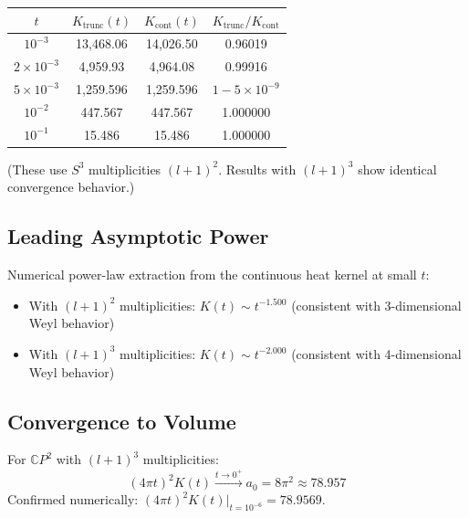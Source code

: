 \documentclass[12pt,a4paper]{article}
\begin{document}
\begin{center}
\begin{tabular}{cccc}
\toprule
$t$ & $K_{\mathrm{trunc}}(t)$ & $K_{\mathrm{cont}}(t)$ & $K_{\mathrm{trunc}}/K_{\mathrm{cont}}$ \\
\midrule
$10^{-3}$ & 13,468.06 & 14,026.50 & 0.96019 \\
$2 \times 10^{-3}$ & 4,959.93 & 4,964.08 & 0.99916 \\
$5 \times 10^{-3}$ & 1,259.596 & 1,259.596 & $1 - 5 \times 10^{-9}$ \\
$10^{-2}$ & 447.567 & 447.567 & 1.000000 \\
$10^{-1}$ & 15.486 & 15.486 & 1.000000 \\
\bottomrule
\end{tabular}
\end{center}

\noindent
(These use $S^3$ multiplicities $(l+1)^2$.  Results with $(l+1)^3$ show
identical convergence behavior.)

\subsection{Leading Asymptotic Power}

Numerical power-law extraction from the continuous heat kernel at small $t$:
\begin{itemize}
\item With $(l+1)^2$ multiplicities: $K(t) \sim t^{-1.500}$
  (consistent with 3-dimensional Weyl behavior)
\item With $(l+1)^3$ multiplicities: $K(t) \sim t^{-2.000}$
  (consistent with 4-dimensional Weyl behavior)
\end{itemize}

\subsection{Convergence to Volume}

For $\mathbb{C}P^2$ with $(l+1)^3$ multiplicities:
\begin{equation}
(4\pi t)^2 K(t) \xrightarrow{t \to 0^+} a_0 = 8\pi^2 \approx 78.957
\end{equation}
Confirmed numerically: $(4\pi t)^2 K(t)|_{t=10^{-6}} = 78.9569$.
\end{document}
